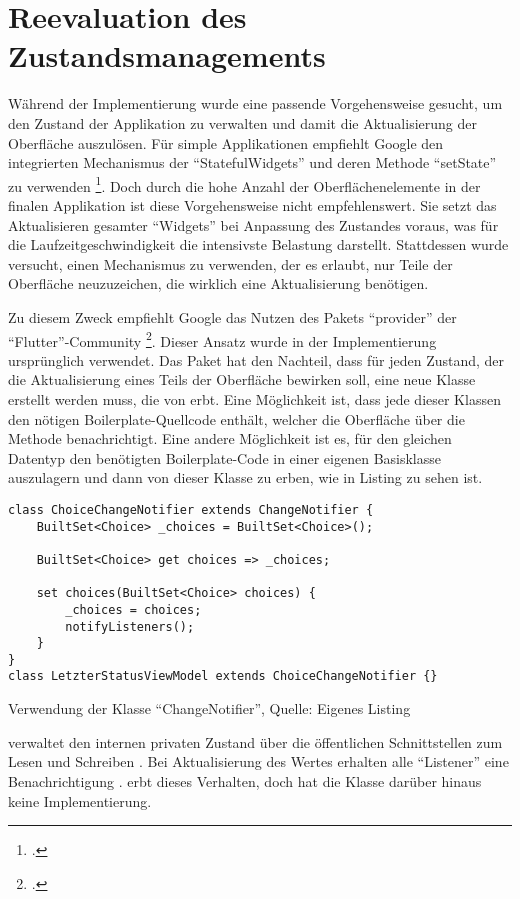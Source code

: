  
\section{Reevaluation des Zustandsmanagements}
\label{sec:Reevaluation-des-Zustandsmanagements}


Während der Implementierung wurde eine passende Vorgehensweise gesucht,
um den Zustand der Applikation zu verwalten
und damit die Aktualisierung der Oberfläche auszulösen.
Für simple Applikationen empfiehlt Google den integrierten Mechanismus der \enquote{StatefulWidgets} und deren Methode \enquote{setState} zu verwenden \footcite[Vgl.][]{AddingInteractivityToYourFlutterApp}.
Doch durch die hohe Anzahl der Oberflächenelemente in der finalen Applikation ist diese Vorgehensweise nicht empfehlenswert.
Sie setzt das Aktualisieren gesamter \enquote{Widgets} bei Anpassung des Zustandes voraus,
was für die Laufzeitgeschwindigkeit die intensivste Belastung darstellt.
Stattdessen wurde versucht,
einen Mechanismus zu verwenden,
der es erlaubt,
nur Teile der Oberfläche neuzuzeichen,
die wirklich eine Aktualisierung benötigen.

Zu diesem Zweck empfiehlt Google das Nutzen des Pakets \enquote{provider} der \enquote{Flutter}-Community \footcite[Vgl.][]{ProviderARecommendedApproach}.
Dieser Ansatz wurde in der Implementierung ursprünglich verwendet.
Das Paket hat den Nachteil,
dass für jeden Zustand,
der die Aktualisierung eines Teils der Oberfläche bewirken soll,
eine neue Klasse erstellt werden muss, die von  erbt.
Eine Möglichkeit ist,
dass jede dieser Klassen den nötigen Boilerplate-Quellcode enthält,
welcher die Oberfläche über die Methode  benachrichtigt.
Eine andere Möglichkeit ist es, für den gleichen Datentyp den benötigten Boilerplate-Code in einer eigenen Basisklasse auszulagern
und dann von dieser Klasse zu erben, wie in Listing \label{lst:ChoiceChangeNotifier} zu sehen ist.
\ifIncludeFigures
  \begin{listing}[h]
    \begin{verbatim}
class ChoiceChangeNotifier extends ChangeNotifier {
    BuiltSet<Choice> _choices = BuiltSet<Choice>();

    BuiltSet<Choice> get choices => _choices;

    set choices(BuiltSet<Choice> choices) {
        _choices = choices;
        notifyListeners();
    }
}
class LetzterStatusViewModel extends ChoiceChangeNotifier {}
\end{verbatim}
    \caption[Verwendung der Klasse \enquote{ChangeNotifier}]{Verwendung der Klasse \enquote{ChangeNotifier}, Quelle: Eigenes Listing}
    \label{lst:ChoiceChangeNotifier}
  \end{listing}
\fi
{} verwaltet den internen privaten Zustand   über die öffentlichen Schnittstellen zum Lesen  und Schreiben .
Bei Aktualisierung des Wertes erhalten alle \enquote{Listener} eine Benachrichtigung .
 erbt dieses Verhalten, doch hat die Klasse darüber hinaus keine Implementierung.

